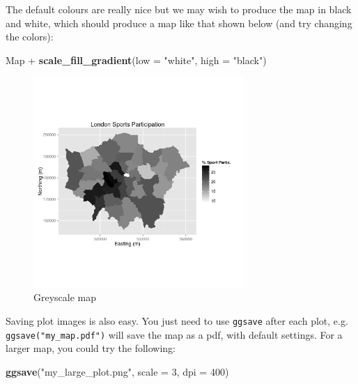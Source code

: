 \documentclass[]{article}
\newenvironment{Shaded}{}{}
\newcommand{\KeywordTok}[1]{\textcolor[rgb]{0.00,0.44,0.13}{\textbf{{#1}}}}
\newcommand{\DataTypeTok}[1]{\textcolor[rgb]{0.56,0.13,0.00}{{#1}}}
\newcommand{\DecValTok}[1]{\textcolor[rgb]{0.25,0.63,0.44}{{#1}}}
\newcommand{\StringTok}[1]{\textcolor[rgb]{0.25,0.44,0.63}{{#1}}}
\newcommand{\NormalTok}[1]{{#1}}
\let\Oldincludegraphics\includegraphics
\renewcommand{\includegraphics}[1]{\Oldincludegraphics[width=8cm]{#1}}
\begin{document}
The default colours are really nice but we may wish to produce the map
in black and white, which should produce a map like that shown below
(and try changing the colors):

\begin{Shaded}
\begin{Highlighting}[]
\NormalTok{Map + }\KeywordTok{scale_fill_gradient}\NormalTok{(}\DataTypeTok{low =} \StringTok{"white"}\NormalTok{, }\DataTypeTok{high =} \StringTok{"black"}\NormalTok{)}
\end{Highlighting}
\end{Shaded}
\begin{figure}[htbp]
\centering
\includegraphics{figure/Greyscale_map.png}
\caption{Greyscale map}
\end{figure}

Saving plot images is also easy. You just need to use \texttt{ggsave}
after each plot, e.g. \texttt{ggsave("my\_map.pdf")} will save the map
as a pdf, with default settings. For a larger map, you could try the
following:

\begin{Shaded}
\begin{Highlighting}[]
\KeywordTok{ggsave}\NormalTok{(}\StringTok{"my_large_plot.png"}\NormalTok{, }\DataTypeTok{scale =} \DecValTok{3}\NormalTok{, }\DataTypeTok{dpi =} \DecValTok{400}\NormalTok{)}
\end{Highlighting}
\end{Shaded}
\end{document}
